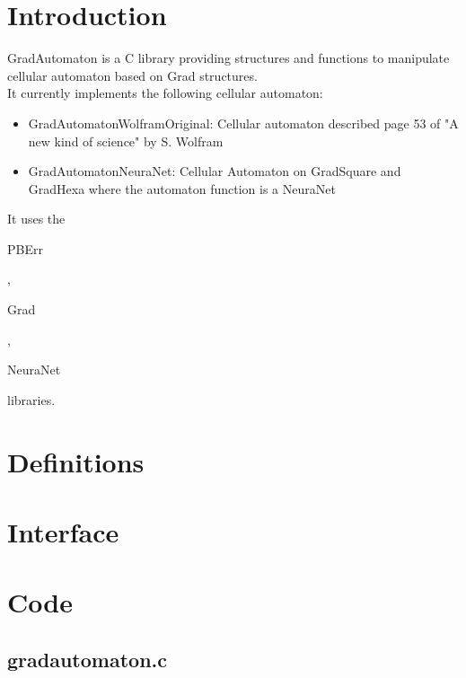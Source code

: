 \section*{Introduction}

GradAutomaton is a C library providing structures and functions to manipulate cellular automaton based on Grad structures.\\

It currently implements the following cellular automaton:\\
\begin{itemize}
\item GradAutomatonWolframOriginal: Cellular automaton described page 53 of "A new kind of science" by S. Wolfram
\item GradAutomatonNeuraNet: Cellular Automaton on GradSquare and GradHexa where the automaton function is a NeuraNet
\end{itemize}

It uses the \begin{ttfamily}PBErr\end{ttfamily}, \begin{ttfamily}Grad\end{ttfamily}, \begin{ttfamily}NeuraNet\end{ttfamily} libraries.\\

\section{Definitions}


\section{Interface}

\begin{scriptsize}
\begin{ttfamily}

\end{ttfamily}
\end{scriptsize}

\section{Code}

\subsection{gradautomaton.c}

